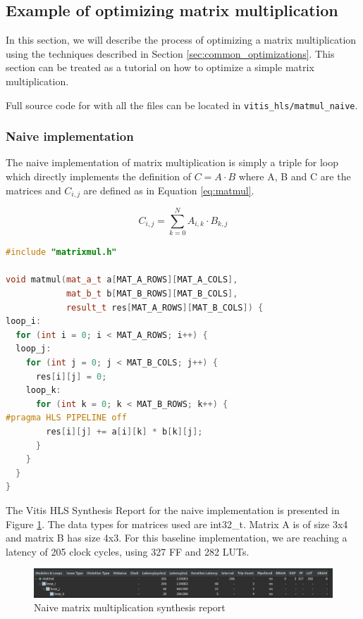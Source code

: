 \documentclass[a4paper, twoside]{report}
\theoremstyle{definition}
\numberwithin{equation}{section}
\begin{document}
\subsection{Example of optimizing matrix multiplication}

In this section, we will describe the process of optimizing a matrix multiplication
using the techniques described in Section \ref{sec:common_optimizations}.
This section can be treated as a tutorial on how to optimize a simple matrix multiplication.

Full source code for with all the files can be located in \texttt{vitis\_hls/matmul\_naive}.

\subsubsection{Naive implementation}

The naive implementation of matrix multiplication is simply a triple for loop
which directly implements the definition of $C = A \cdot B$ where A, B and C are the matrices
and $C_{i,j}$ are defined as in Equation \ref{eq:matmul}.

\begin{equation} \label{eq:matmul}
    C_{i,j} = \sum_{k=0}^{N} A_{i,k} \cdot B_{k,j}
\end{equation}


\begin{lstlisting}[language=c++,numbers=none]
#include "matrixmul.h"

void matmul(mat_a_t a[MAT_A_ROWS][MAT_A_COLS],
            mat_b_t b[MAT_B_ROWS][MAT_B_COLS],
            result_t res[MAT_A_ROWS][MAT_B_COLS]) {
loop_i:
  for (int i = 0; i < MAT_A_ROWS; i++) {
  loop_j:
    for (int j = 0; j < MAT_B_COLS; j++) {
      res[i][j] = 0;
    loop_k:
      for (int k = 0; k < MAT_B_ROWS; k++) {
#pragma HLS PIPELINE off
        res[i][j] += a[i][k] * b[k][j];
      }
    }
  }
}
\end{lstlisting}


The Vitis HLS Synthesis Report for the naive implementation is presented in Figure \ref{fig:matmul_naive_synth}.
The data types for matrices used are int32\_t. Matrix A is of size 3x4 and matrix B has size 4x3.
For this baseline implementation, we are reaching a latency of 205 clock cycles, using 327 FF and 282 LUTs.


\begin{figure}[h!]
    \centering
    \includegraphics[width=\textwidth]{matmul_naive_synth.png}
    \caption{Naive matrix multiplication synthesis report}
    \label{fig:matmul_naive_synth}
\end{figure}
\end{document}
